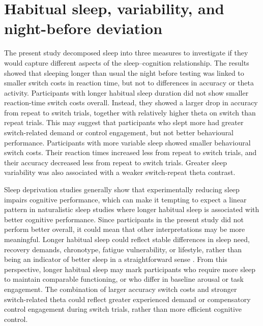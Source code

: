 \documentclass[12pt,a4paper]{report}
\begin{document}
\section{Habitual sleep, variability, and night-before deviation}

The present study decomposed sleep into three measures to investigate if they would capture different aspects of the sleep--cognition relationship. The results showed that sleeping longer than usual the night before testing was linked to smaller switch costs in reaction time, but not to differences in accuracy or theta activity. Participants with longer habitual sleep duration did not show smaller reaction-time switch costs overall. Instead, they showed a larger drop in accuracy from repeat to switch trials, together with relatively higher theta on switch than repeat trials. This may suggest that participants who slept more had greater switch-related demand or control engagement, but not better behavioural performance. Participants with more variable sleep showed smaller behavioural switch costs. Their reaction times increased less from repeat to switch trials, and their accuracy decreased less from repeat to switch trials. Greater sleep variability was also associated with a weaker switch-repeat theta contrast.

Sleep deprivation studies generally show that experimentally reducing sleep impairs cognitive performance, which can make it tempting to expect a linear pattern in naturalistic sleep studies where longer habitual sleep is associated with better cognitive performance. Since participants in the present study did not perform better overall, it could mean that other interpretations may be more meaningful. Longer habitual sleep could reflect stable differences in sleep need, recovery demands, chronotype, fatigue vulnerability, or lifestyle, rather than being an indicator of better sleep in a straightforward sense \parencite{fjell2024sleep}. From this perspective, longer habitual sleep may mark participants who require more sleep to maintain comparable functioning, or who differ in baseline arousal or task engagement. The combination of larger accuracy switch costs and stronger switch-related theta could reflect greater experienced demand or compensatory control engagement during switch trials, rather than more efficient cognitive control.
\end{document}
